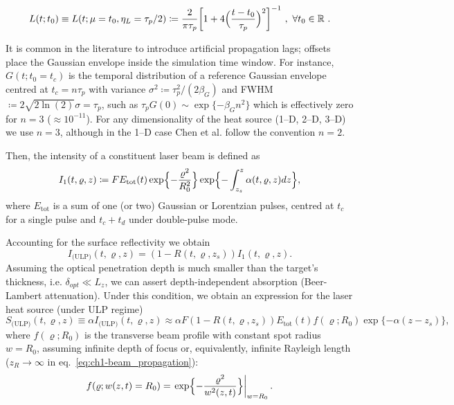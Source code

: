 \begin{equation}
  L(t; t_0) \equiv L(t; \mu = t_0, \eta_L = \tau_p/2) \coloneqq \frac{2}{\pi \tau_p} \biggl[ 1 + 4 \Bigr(\frac{t - t_0}{\tau_p}\Bigl)^2  \biggr]^{-1} \ , \ \forall t_0 \in \mathbb{R} \ .
  \label{eq:ch1-lorentzian}
\end{equation}

It is common in the literature to introduce artificial propagation lags; offsets place the Gaussian envelope inside the simulation time window.
For instance, $G(t; t_0=t_c)$ is the temporal distribution of a reference Gaussian envelope centred at $t_c = n\tau_p$ with variance $\sigma^2 \coloneqq \tau_p^2/(2\beta_G)$ and FWHM$\coloneqq 2 \sqrt{2\ln(2)} \sigma = \tau_p$,
such as $\tau_pG(0) \sim \exp\{-\beta_G n^2\}$ which is effectively zero for $n=3$ ($\approx 10^{-11}$).
For any dimensionality of the heat source (1--D, 2--D, 3--D) we use $n=3$, although in the 1--D case Chen et al. \cite{Chen_2010} follow the convention $n=2$.

\noindent
Then, the intensity of a constituent laser beam is defined as
\begin{equation}
  I_1(t,\varrho,z) \coloneqq F E_\text{tot}(t) \exp\Bigl\{ -\frac{\varrho^2}{R_0^2} \Bigr\} \exp\Bigl\{ - \int_{z_s}^z \alpha(t,\varrho,z)dz \Bigr\},
  \label{eq:ch1-intensity_laser_beam}
\end{equation}
where $E_\text{tot}$ is a sum of one (or two) Gaussian or Lorentzian pulses,
centred at $t_c$ for a single pulse and $t_c + t_d$ under double-pulse mode.

\noindent
Accounting for the surface reflectivity we obtain
%
\begin{equation}
  I_\text{(ULP)}(t,\varrho,z) = (1 - R(t,\varrho,z_s)) I_1(t,\varrho,z).
  \label{eq:ch1-intensity_reflect_I_1}
\end{equation}
%
Assuming the optical penetration depth is much smaller than the target's thickness, i.e. $\delta_{opt} \ll L_z$, we can assert depth-independent absorption (Beer-Lambert attenuation).
Under this condition, we obtain an expression for the laser heat source (under ULP regime)
\begin{equation}
  S_\text{(ULP)}(t,\varrho,z) \equiv \alpha I_\text{(ULP)}(t,\varrho,z) \approx \alpha F (1 - R(t,\varrho,z_s)) E_\text{tot}(t) f(\varrho; R_0) \exp\{- \alpha (z - z_s)\},
  \label{eq:ch1-volumetric_heat_source}
\end{equation}
where $f(\varrho; R_0)$ is the transverse beam profile with constant spot radius $w = R_0$,
assuming infinite depth of focus or, equivalently, infinite Rayleigh length ($z_R \rightarrow \infty$ in eq.~\eqref{eq:ch1-beam_propagation}):
\begin{equation}
  f(\varrho; w(z,t)= R_0) = \left. \exp\Bigl\{ - \frac{\varrho^2}{w^2(z,t)} \Bigr\} \right|_{w=R_0}.
  \label{eq:ch1-beam_profile}
\end{equation}

